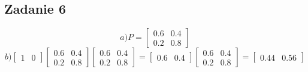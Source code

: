 \subsection{Zadanie 6}

$$
a)  P = 
\left[
\begin{array}{ccc}
0.6 & 0.4  \\
0.2 & 0.8  
\end{array}
\right]
$$
$$ b) 
\left[
\begin{array}{ccc}
1 & 0
\end{array}
\right]
\left[
\begin{array}{ccc}
0.6 & 0.4  \\
0.2 & 0.8  
\end{array}
\right]
\left[
\begin{array}{ccc}
0.6 & 0.4  \\
0.2 & 0.8  
\end{array}
\right]
=
\left[
\begin{array}{ccc}
0.6 & 0.4  
\end{array}
\right]
\left[
\begin{array}{ccc}
0.6 & 0.4  \\
0.2 & 0.8  
\end{array}
\right] 
=
\left[
\begin{array}{ccc}
0.44 & 0.56
\end{array}
\right]
$$



